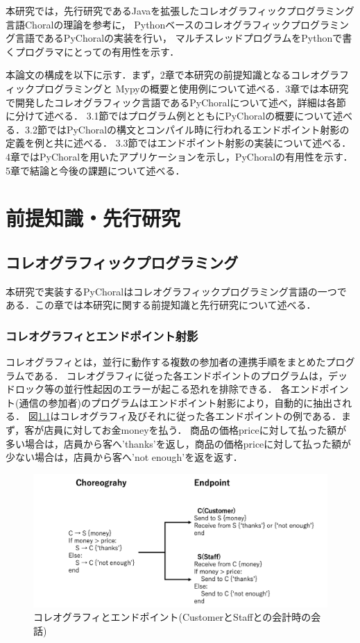 \documentclass{thesis}
\begin{document}
本研究では，先行研究であるJavaを拡張したコレオグラフィックプログラミング言語Choralの理論を参考に，
Pythonベースのコレオグラフィックプログラミング言語であるPyChoralの実装を行い，
マルチスレッドプログラムをPythonで書くプログラマにとっての有用性を示す．

本論文の構成を以下に示す．まず，2章で本研究の前提知識となるコレオグラフィックプログラミングと
Mypyの概要と使用例について述べる．3章では本研究で開発したコレオグラフィック言語であるPyChoralについて述べ，詳細は各節に分けて述べる．
3.1節ではプログラム例とともにPyChoralの概要について述べる．3.2節ではPyChoralの構文とコンパイル時に行われるエンドポイント射影の定義を例と共に述べる．
3.3節ではエンドポイント射影の実装について述べる．4章ではPyChoralを用いたアプリケーションを示し，PyChoralの有用性を示す．5章で結論と今後の課題について述べる．
\chapter{前提知識・先行研究}
\section{コレオグラフィックプログラミング}
本研究で実装するPyChoralはコレオグラフィックプログラミング言語の一つである．この章では本研究に関する前提知識と先行研究について述べる．
\subsection{コレオグラフィとエンドポイント射影}
コレオグラフィ\cite{Choreographic}とは，並行に動作する複数の参加者の連携手順をまとめたプログラムである．
コレオグラフィに従った各エンドポイントのプログラムは，デッドロック等の並行性起因のエラーが起こる恐れを排除できる．
各エンドポイント(通信の参加者)のプログラムはエンドポイント射影\cite{endpoint}により，自動的に抽出される．
図\ref{cho}はコレオグラフィ及びそれに従った各エンドポイントの例である．まず，客が店員に対してお金\textsf{money}を払う．
商品の価格\textsf{price}に対して払った額が多い場合は，店員から客へ\textsf{'thanks'}を返し，商品の価格\textsf{price}に対して払った額が少ない場合は，店員から客へ\textsf{'not enough'}を返を返す．
\begin{figure}[H]
  \centering
  \includegraphics[scale=0.5]{image/cho.png}
  \caption{コレオグラフィとエンドポイント(CustomerとStaffとの会計時の会話)}
  \label{cho}
\end{figure}
\end{document}

